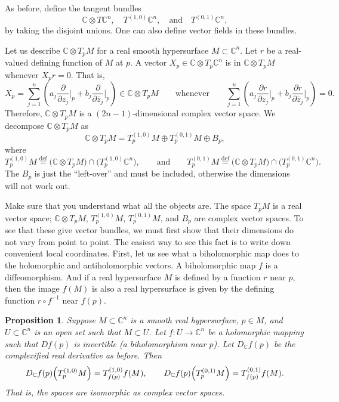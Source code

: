 \documentclass[12pt,openany]{book}
\newcommand{\C}{{\mathbb{C}}}
\theoremstyle{plain}
\newtheorem{prop}[thm]{Proposition}
\theoremstyle{remark}
\theoremstyle{definition}
\theoremstyle{exercise}
\theoremstyle{example}
\begin{document}
As before, define the tangent bundles
\begin{equation*}
\C \otimes T\C^n,
\quad
T^{(1,0)} \C^n,
\quad \text{and} \quad
T^{(0,1)} \C^n ,
\end{equation*}
by taking the disjoint unions.
One can also define vector fields in these bundles.

Let us describe $\C \otimes T_pM$
for a real smooth hypersurface $M \subset \C^n$.
Let $r$ be a real-valued defining function of
$M$ at $p$.  A vector
$X_p \in \C \otimes T_p\C^n$ is in
$\C \otimes T_pM$ whenever $X_p r = 0$.  That is,
\begin{equation*}
X_p = \sum_{j=1}^n
\left(
a_j 
\frac{\partial}{\partial z_j} \Big|_p
+
b_j
\frac{\partial}{\partial \bar{z}_j} \Big|_p
\right) \in \C \otimes T_p M
\qquad
\text{whenever}
\qquad
 \sum_{j=1}^n
\left(
a_j 
\frac{\partial r}{\partial z_j} \Big|_p
+
b_j
\frac{\partial r}{\partial \bar{z}_j} \Big|_p
\right)
= 0 .
\end{equation*}
Therefore, $\C \otimes T_p M$ is a $(2n-1)$-dimensional complex vector space.
We decompose 
$\C \otimes T_p M$ as
\begin{equation*}
\C \otimes T_pM = 
T_p^{(1,0)} M \oplus T_p^{(0,1)} M \oplus B_p ,
\end{equation*}
where
\begin{equation*}
T_p^{(1,0)} M \overset{\text{def}}{=} \bigl( \C \otimes T_pM \bigr) \cap
\bigl( T_p^{(1,0)} \C^n \bigr),  \qquad \text{and}
\qquad
T_p^{(0,1)} M \overset{\text{def}}{=} \bigl( \C \otimes T_pM \bigr) \cap
\bigl( T_p^{(0,1)} \C^n \bigr) .
\end{equation*}
The $B_p$ is just the ``left-over'' and must
be included, otherwise the dimensions will not work out.

Make sure that you understand what all the objects are.  The space
$T_pM$ is a real vector space; $\C \otimes T_pM$, $T_p^{(1,0)}M$,
$T_p^{(0,1)} M$, and $B_p$ are complex vector spaces.  To see that
these give vector bundles,
we must first show that their dimensions do not vary
from point to point.  The easiest way to see this fact is to write down
convenient local coordinates.  First, let us see what a biholomorphic map
does to the holomorphic and antiholomorphic vectors.  A biholomorphic map
$f$ is a diffeomorphism.  And if a real hypersurface $M$ is defined
by a function $r$ near $p$, then the image $f(M)$ is also
a real hypersurface is given by the defining function
$r \circ f^{-1}$ near $f(p)$.


\begin{prop}
Suppose $M \subset \C^n$ is a smooth real hypersurface, $p \in M$,
and $U \subset \C^n$ is an open set such that $M \subset U$.
Let $f \colon U \to \C^n$ be a holomorphic mapping such
that $D f(p)$ is invertible (a biholomorphism near $p$).  Let $D_\C f(p)$ be
the complexified real derivative as before.  Then
\begin{equation*}
D_\C f(p)\Bigl(T_p^{(1,0)}M\Bigr) = T_{f(p)}^{(1,0)}f(M), \qquad
D_\C f(p)\Bigl(T_p^{(0,1)}M\Bigr) = T_{f(p)}^{(0,1)}f(M).
\end{equation*}
That is, the spaces are isomorphic as complex vector spaces.
\end{prop}
\end{document}
